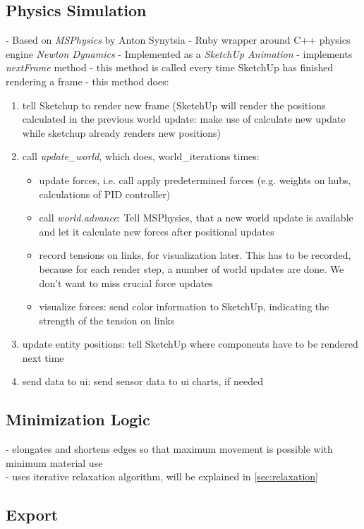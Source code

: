 \subsection{Physics Simulation}
- Based on \textit{MSPhysics} by Anton Synytsia
- Ruby wrapper around C++ physics engine \textit{Newton Dynamics}
- Implemented as a \textit{SketchUp Animation}
- implements \textit{nextFrame} method
- this method is called every time SketchUp has finished rendering a frame
- this method does:
\begin{enumerate}
    \item tell Sketchup to render new frame (SketchUp will render the positions calculated in the previous world update: make use of calculate new update while sketchup already renders new positions)
    \item call \textit{update\_world}, which does, world\_iterations times:
    \begin{itemize}
        \item update forces, i.e. call apply predetermined forces (e.g. weights on hubs, calculations of PID controller)
        \item call \textit{world.advance}: Tell MSPhysics, that a new world update is available and let it calculate new forces after positional updates
        \item record tensions on links, for visualization later. This has to be recorded, because for each render step, a number of world updates are done. We don't want to miss crucial force updates
        \item visualize forces: send color information to SketchUp, indicating the strength of the tension on links
    \end{itemize}
    \item update entity positions: tell SketchUp where components have to be rendered next time
    \item send data to ui: send sensor data to ui charts, if needed
\end{enumerate}
\subsection{Minimization Logic}
- elongates and shortens edges so that maximum movement is possible with minimum material use\\
- uses iterative relaxation algorithm, will be explained in \ref{sec:relaxation}

\subsection{Export}

